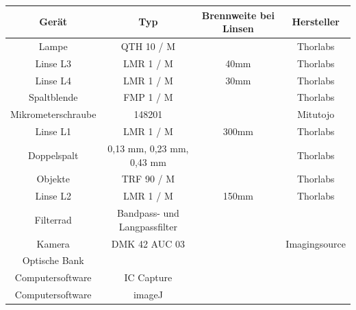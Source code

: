 \documentclass[11pt,ngerman]{scrartcl}
\begin{document}
\begin{table}[H]
	\begin{center}
		\begin{tabular}{|c|c|c|c|} \hline
			\textbf{Gerät}     & \textbf{Typ}                 & \textbf{Brennweite bei Linsen} & \textbf{Hersteller} \\ \hline

			Lampe              & QTH 10 / M                   &                                & Thorlabs            \\ \hline
			Linse L3           & LMR 1 / M                    & 40mm                           & Thorlabs            \\ \hline
			Linse L4           & LMR 1 / M                    & 30mm                           & Thorlabs            \\ \hline
			Spaltblende        & FMP 1 / M                    &                                & Thorlabs            \\ \hline
			Mikrometerschraube & 148201                       &                                & Mitutojo            \\ \hline
			Linse L1           & LMR 1 / M                    & 300mm                          & Thorlabs            \\ \hline
			Doppelspalt        & 0,13 mm, 0,23 mm, 0,43 mm    &                                & Thorlabs            \\ \hline
			Objekte            & TRF 90 / M                   &                                & Thorlabs            \\ \hline
			Linse L2           & LMR 1 / M                    & 150mm                          & Thorlabs            \\ \hline
			Filterrad          & Bandpass- und Langpassfilter &                                &                     \\ \hline
			Kamera             & DMK 42 AUC 03                &                                & Imagingsource       \\ \hline
			Optische Bank      &                              &                                &                     \\ \hline
			Computersoftware   & IC Capture                   &                                &                     \\ \hline
			Computersoftware   & imageJ                       &                                &                     \\ \hline
		\end{tabular}
	\end{center}
\end{table}
\end{document}
